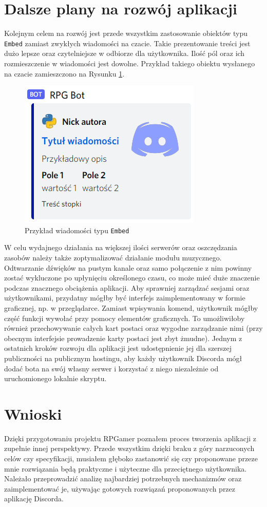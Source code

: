 \documentclass[shortabstract,inz]{iithesis}
\begin{document}
		\section{Dalsze plany na rozwój aplikacji} 
	 	Kolejnym celem na rozwój jest przede wszystkim zastosowanie obiektów typu \texttt{Embed} zamiast zwykłych wiadomości na czacie. Takie prezentowanie treści jest dużo lepsze oraz czytelniejsze w odbiorze dla użytkownika. Ilość pól oraz ich rozmieszczenie w wiadomości jest dowolne. Przykład takiego obiektu wysłanego na czacie zamieszczono na Rysunku \ref{embedexample}.
	 	\begin{figure}[h]
	 		\centering
	 		\includegraphics{embed}
	 		\caption{Przykład wiadomości typu \texttt{Embed}}
	 		\label{embedexample}
	 	\end{figure}
	 	
	 	W celu wydajnego działania na większej ilości serwerów oraz oszczędzania zasobów należy także zoptymalizować działanie modułu muzycznego. Odtwarzanie dźwięków na pustym kanale oraz samo połączenie z nim powinny zostać wykluczone po upłynięciu określonego czasu, co może mieć duże znaczenie podczas znacznego obciążenia aplikacji. Aby sprawniej zarządzać sesjami oraz użytkownikami, przydatny mógłby być interfejs zaimplementowany w formie graficznej, np. w przeglądarce. Zamiast wpisywania komend, użytkownik mógłby część funkcji wywołać przy pomocy elementów graficznych. To umożliwiłoby również przechowywanie całych kart postaci oraz wygodne zarządzanie nimi (przy obecnym interfejsie prowadzenie karty postaci jest zbyt żmudne). Jednym z ostatnich kroków rozwoju dla aplikacji jest udostępnienie jej dla szerszej publiczności na publicznym hostingu, aby każdy użytkownik Discorda mógł dodać bota na swój własny serwer i korzystać z niego niezależnie od uruchomionego lokalnie skryptu.
	 	
	 	\section{Wnioski}
	 	Dzięki przygotowaniu projektu RPGamer poznałem proces tworzenia aplikacji z zupełnie innej perspektywy. Przede wszystkim dzięki braku z góry narzuconych celów czy specyfikacji, musiałem głęboko zastanowić się czy proponowane przeze mnie rozwiązania będą praktyczne i użyteczne dla przeciętnego użytkownika. Należało przeprowadzić analizę najbardziej potrzebnych mechanizmów oraz zaimplementować je, używając gotowych rozwiązań proponowanych przez aplikację Discorda.
	 	
\end{document}
